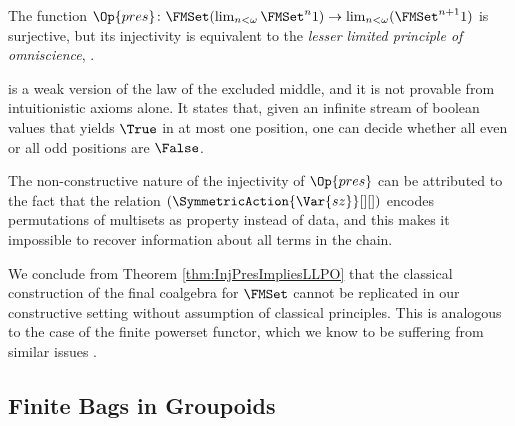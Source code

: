 \documentclass{easychair}
\begin{document}
  \begin{theorem}\label{thm:InjPresImpliesLLPO}
    The function 
        $\Op{pres}\colon
            \FMSet (\lim_{n < \omega} \FMSet^n 1)
            \to
            \lim_{n < \omega} (\FMSet^{n+1} 1)$
    is surjective,
    but its injectivity is equivalent to the \emph{lesser limited principle of omniscience}, \LLPO.
  \end{theorem}
  \LLPO{} \cite[{Ch.\@ 1}]{Bridges1987} is a weak version of the law
  of the excluded middle, and it is not provable from intuitionistic
  axioms alone.  It states that, given an infinite stream of boolean
  values that yields $\True$ in at most one position, one can decide
  whether all even or all odd positions are $\False$.

  The non-constructive nature of the injectivity of
  $\Op{pres}$ can be attributed to the fact that the
  relation $(\SymmetricAction{\Var{sz}}[][])$ encodes permutations of
  multisets as property instead of data, and this makes it impossible
  to recover information about all terms in the chain.

  We conclude from Theorem \ref{thm:InjPresImpliesLLPO} that the
  classical construction of the final coalgebra for $\FMSet$ cannot be
  replicated in our constructive setting without assumption of
  classical principles. This is analogous to the case of the finite
  powerset functor, which we know to be suffering from similar issues \cite{Veltri2021}.

  \subsection*{Finite Bags in Groupoids}
\end{document}
